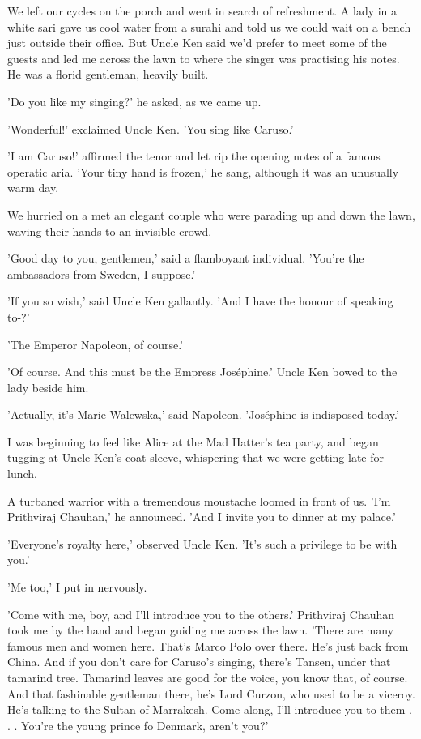 \par
We left our cycles on the porch and went in search of refreshment. A lady in a white sari gave us cool water from a surahi and told us we could wait on a bench just outside their office. But Uncle Ken said we'd prefer to meet some of the guests and led me across the lawn to where the singer was practising his notes. He was a florid gentleman, heavily built.
\par
'Do you like my singing?' he asked, as we came up.
\par
'Wonderful!' exclaimed Uncle Ken. 'You sing like Caruso.'
\par
'I am Caruso!' affirmed the tenor and let rip the opening notes of a famous operatic aria. 'Your tiny hand is frozen,' he sang, although it was an unusually warm day.
\par
We hurried on a met an elegant couple who were parading up and down the lawn, waving their hands to an invisible crowd.
\par
'Good day to you, gentlemen,' said a flamboyant individual. 'You're the ambassadors from Sweden, I suppose.'
\par
'If you so wish,' said Uncle Ken gallantly. 'And I have the honour of speaking to-?'
\par
'The Emperor Napoleon, of course.'
\par
'Of course. And this must be the Empress Joséphine.' Uncle Ken bowed to the lady beside him.
\par
'Actually, it's Marie Walewska,' said Napoleon. 'Joséphine is indisposed today.'
\par
I was beginning to feel like Alice at the Mad Hatter's tea party, and began tugging at Uncle Ken's coat sleeve, whispering that we were getting late for lunch.
\par
A turbaned warrior with a tremendous moustache loomed in front of us. 'I'm Prithviraj Chauhan,' he announced. 'And I invite you to dinner at my palace.'
\par
'Everyone's royalty here,' observed Uncle Ken. 'It's such a privilege to be with you.'
\par
'Me too,' I put in nervously.
\par
'Come with me, boy, and I'll introduce you to the others.' Prithviraj Chauhan took me by the hand and began guiding me across the lawn. 'There are many famous men and women here. That's Marco Polo over there. He's just back from China. And if you don't care for Caruso's singing, there's Tansen, under that tamarind tree. Tamarind leaves are good for the voice, you know that, of course. And that fashinable gentleman there, he's Lord Curzon, who used to be a viceroy. He's talking to the Sultan of Marrakesh. Come along, I'll introduce you to them . . . You're the young prince fo Denmark, aren't you?'
